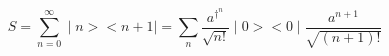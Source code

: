 \begin{equation}
S= \sum_{n=0}^{\infty} \mid n><n+1 \mid = \sum_{n} \frac{a^{\dag^{n}}}{\sqrt{n!}}
\mid 0><0\mid \frac{a^{n+1}}{\sqrt{(n+1)!}}
\end{equation}

